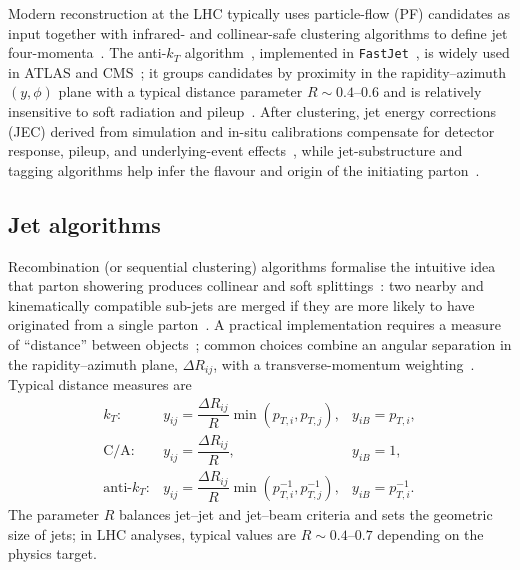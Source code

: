 Modern reconstruction at the LHC typically uses particle-flow (PF) candidates as input together with infrared- and collinear-safe clustering algorithms to define jet four-momenta~\cite{dummy}. The anti-$k_T$ algorithm~\parencite{Cacciari:2008gp}, implemented in \texttt{FastJet}~\parencite{Cacciari:2011ma}, is widely used in ATLAS and CMS~\cite{dummy}; it groups candidates by proximity in the rapidity–azimuth $(y,\phi)$ plane with a typical distance parameter $R\sim0.4$–0.6 and is relatively insensitive to soft radiation and pileup~\cite{dummy}. After clustering, jet energy corrections (JEC) derived from simulation and in-situ calibrations compensate for detector response, pileup, and underlying-event effects~\cite{dummy}, while jet-substructure and tagging algorithms help infer the flavour and origin of the initiating parton~\cite{dummy}.

\subsection{Jet algorithms}

Recombination (or sequential clustering) algorithms formalise the intuitive idea that parton showering produces collinear and soft splittings~\cite{dummy}: two nearby and kinematically compatible sub-jets are merged if they are more likely to have originated from a single parton~\cite{dummy}. A practical implementation requires a measure of ``distance'' between objects~\cite{dummy}; common choices combine an angular separation in the rapidity–azimuth plane, $\Delta R_{ij}$, with a transverse-momentum weighting~\cite{dummy}. Typical distance measures are~\cite{dummy}
\[
\begin{array}{lll}
k_T: & y_{ij}=\dfrac{\Delta R_{ij}}{R}\min(p_{T,i},p_{T,j}), & y_{iB}=p_{T,i},\\[6pt]
\mathrm{C/A}: & y_{ij}=\dfrac{\Delta R_{ij}}{R}, & y_{iB}=1,\\[6pt]
\text{anti-}k_T: & y_{ij}=\dfrac{\Delta R_{ij}}{R}\min(p_{T,i}^{-1},p_{T,j}^{-1}), & y_{iB}=p_{T,i}^{-1}.
\end{array}
\]
The parameter $R$ balances jet–jet and jet–beam criteria and sets the geometric size of jets; in LHC analyses, typical values are $R\sim0.4\text{--}0.7$ depending on the physics target.

